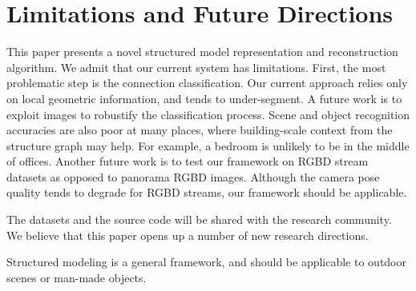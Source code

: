 \section{Limitations and Future Directions}

This paper presents a novel structured model representation and
reconstruction algorithm.
We admit that our current system has limitations. First, the most
problematic step is the connection classification. Our current approach
relies only on local geometric information, and tends to under-segment.
A future work is to exploit images to robustify the classification
process. Scene and object recognition accuracies are also poor at many
places, where building-scale context from the structure graph may
help. For example, a bedroom is unlikely to be in the middle of offices.
Another future work is to test our framework on RGBD stream datasets as
opposed to panorama RGBD images. Although the camera pose quality tends
to degrade for RGBD streams, our framework should be applicable.

The datasets and the source code will be shared with the research
community. We believe that this paper opens up a number of new research
directions.

Structured modeling is a general framework, and should be applicable to
outdoor scenes or man-made objects.
%

